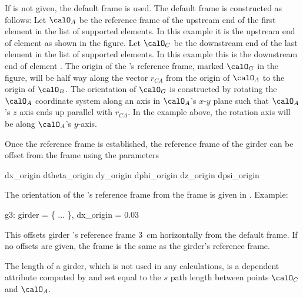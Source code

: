 If  is not given, the default  frame is used. The default 
frame is constructed as follows: Let $\calO_A$ be the reference frame of the upstream end of the
first element in the list of supported elements. In this example it is the upstream end of element
 as shown in the figure. Let $\calO_C$ be the downstream end of the last element in the list
of supported elements. In this example this is the downstream end of element . The origin of
the 's reference frame, marked $\calO_G$ in the figure, will be half way along the vector
$r_{CA}$ from the origin of $\calO_A$ to the origin of $\calO_B$.  The orientation of $\calO_G$ is
constructed by rotating the $\calO_A$ coordinate system along an axis in $\calO_A$'s $x$-$y$ plane
such that $\calO_A$'s $z$ axis ends up parallel with $r_{CA}$. In the example above, the rotation
axis will be along $\calO_A$'s $y$-axis.

Once the  reference frame is established, the reference frame of the girder can be offset
from the  frame using the parameters
\begin{example}
  dx_origin    dtheta_origin
  dy_origin    dphi_origin
  dz_origin    dpsi_origin
\end{example} 
The orientation of the 's reference frame from the 
frame is given in . Example:
\begin{example}
  g3: girder = \{ ... \}, dx_origin = 0.03
\end{example}
This offsets girder 's reference frame 3~cm horizontally from
the default  frame. If no offsets are given, the
 frame is the same as the girder's reference frame.

The length  of a girder, which is not used in any calculations,
is a dependent attribute computed by \bmad and set equal to the $s$
path length between points $\calO_C$ and $\calO_A$.

